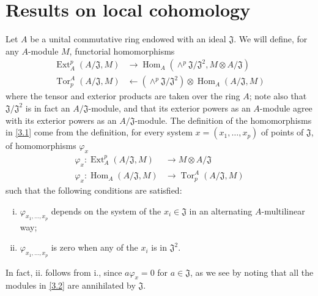 \documentclass{article}
\theoremstyle{plain}
\theoremstyle{definition}
\newcommand{\from}{\leftarrow}
\DeclareMathOperator{\Ext}{Ext}
\DeclareMathOperator{\Hom}{Hom}
\DeclareMathOperator{\Tor}{Tor}
\newcommand{\oldpage}[1]{\marginpar{\footnotesize$\Big\vert$ \textit{p.~#1}}}
\begin{document}
\section{Results on local cohomology}
\label{section3}

Let $A$ be a unital commutative ring endowed with an ideal $\mathfrak{J}$.
We will define, for any $A$-module $M$, functorial homomorphisms
\[
\label{3.1}
  \begin{aligned}
    \Ext_A^p(A/\mathfrak{J},M) &\to \Hom_A(\wedge^p\mathfrak{J}/\mathfrak{J}^2,M\otimes A/\mathfrak{J})
  \\\Tor_p^A(A/\mathfrak{J},M) &\from (\wedge^p\mathfrak{J}/\mathfrak{J}^2)\otimes\Hom_A(A/\mathfrak{J},M)
  \end{aligned}
\tag{3.1}
\]
where the tensor and exterior products are taken over the ring $A$;
note also that $\mathfrak{J}/\mathfrak{J}^2$ is in fact an $A/\mathfrak{J}$-module, and that its exterior powers as an $A$-module agree with its exterior powers as an $A/\mathfrak{J}$-module.
The definition of the homomorphisms in \cref{3.1} come from the definition, for every system $x=(x_1,\ldots,x_p)$ of points of $\mathfrak{J}$, of homomorphisms $\varphi_x$
\[
\label{3.2}
  \begin{aligned}
    \varphi_x\colon \Ext_A^p(A/\mathfrak{J},M) &\to M\otimes A/\mathfrak{J}
  \\\varphi_x\colon \Hom_A(A/\mathfrak{J},M) &\to \Tor_p^A(A/\mathfrak{J},M)
  \end{aligned}
\tag{3.2}
\]
such that the following conditions are satisfied:
\oldpage{149-06}
\begin{enumerate}[i.]
  \item $\varphi_{x_1,\ldots,x_p}$ depends on the system of the $x_i\in\mathfrak{J}$ in an alternating $A$-multilinear way;
  \item $\varphi_{x_1,\ldots,x_p}$ is zero when any of the $x_i$ is in $\mathfrak{J}^2$.
\end{enumerate}

In fact, ii. follows from i., since $a\varphi_x=0$ for $a\in\mathfrak{J}$, as we see by noting that all the modules in \cref{3.2} are annihilated by $\mathfrak{J}$.
\end{document}
